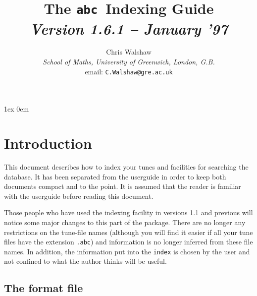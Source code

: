 \parskip 1ex
\parindent 0em
\oddsidemargin -10mm \evensidemargin -10mm
\marginparwidth 40pt \marginparsep 5mm
\topmargin -10mm
\textheight 9in
\textwidth 7in
\newcommand{\abc}{{\tt abc}}
\newcommand{\abctmtex}{{\bf ABC2M\TeX}}


\title{The \abc\ Indexing Guide \\ {\it Version 1.6.1 -- January '97}}
\author{Chris Walshaw \\
{\it School of Maths, University of Greenwich, London, G.B.} \\
email: {\tt C.Walshaw@gre.ac.uk}
}
\date{}

\maketitle

\section{Introduction}

This document describes how to index your tunes and facilities for
searching the database. It has been separated from the userguide
in order to keep both documents compact and to the point. It is assumed
that the reader is familiar with the userguide before reading this document.

Those people who have used the indexing facility in versions 1.1 and previous
will notice some major changes to this part of the package.
There are no longer any restrictions on the tune-file names (although you will
find it easier if all  your tune files have the extension {\tt .abc}) and
information is no longer inferred from  these file names. In addition, the
information put into the {\tt index} is chosen by the user and not confined to
what the author thinks will be useful.

\subsection{The format file}

